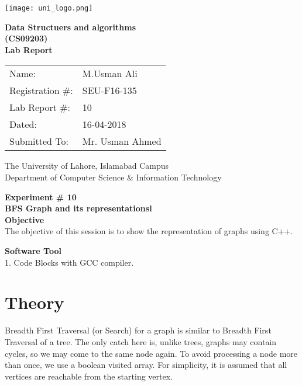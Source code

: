 \documentclass[11pt]{article}            %
\begin{document}
\begin{titlepage}
    \centering
  \vfill
    \texttt{[image: uni\_logo.png]} \\ 
	\vskip2cm
    {\bfseries\Large
	Data Structuers and algorithms \\ (CS09203)\\
	
	\vskip2cm
	Lab Report 
	 
	\vskip2cm
	}    

\begin{center}
\begin{tabular}{ l l  } 

Name: & M.Usman Ali \\ 
Registration \#: & SEU-F16-135 \\ 
Lab Report \#: & 10 \\ 
 Dated:& 16-04-2018\\ 
Submitted To:& Mr. Usman Ahmed\\ 

\end{tabular}
\end{center}
    \vfill
    The University of Lahore, Islamabad Campus\\
Department of Computer Science \& Information Technology
\end{titlepage}


    
    {\bfseries\Large
\centering
	Experiment \# 10 \\

BFS Graph and its representationsl \\
	
	}    
 \vskip1cm
 \textbf {Objective}\\ The objective of this session is to show the representation of graphs using C++. 
 
 \textbf {Software Tool} \\
 1. Code Blocks with GCC compiler.

\section{Theory }              

Breadth First Traversal (or Search) for a graph is similar to Breadth First Traversal of a tree. The only catch here is, unlike trees, graphs may contain cycles, so we may come to the same node again. To avoid processing a node more than once, we use a boolean visited array. For simplicity, it is assumed that all vertices are reachable from the starting vertex.
\end{document}
